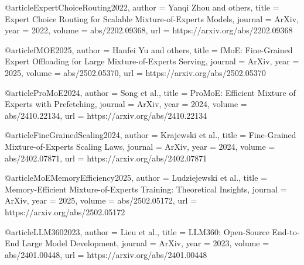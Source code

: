 @article{ExpertChoiceRouting2022,
  author    = {Yanqi Zhou and others},
  title     = {Expert Choice Routing for Scalable Mixture-of-Experts Models},
  journal   = {ArXiv},
  year      = {2022},
  volume    = {abs/2202.09368},
  url       = {https://arxiv.org/abs/2202.09368}
}

@article{fMOE2025,
  author    = {Hanfei Yu and others},
  title     = {fMoE: Fine-Grained Expert Offloading for Large Mixture-of-Experts Serving},
  journal   = {ArXiv},
  year      = {2025},
  volume    = {abs/2502.05370},
  url       = {https://arxiv.org/abs/2502.05370}
}

@article{ProMoE2024,
  author    = {Song et al.},
  title     = {ProMoE: Efficient Mixture of Experts with Prefetching},
  journal   = {ArXiv},
  year      = {2024},
  volume    = {abs/2410.22134},
  url       = {https://arxiv.org/abs/2410.22134}
}

@article{FineGrainedScaling2024,
  author    = {Krajewski et al.},
  title     = {Fine-Grained Mixture-of-Experts Scaling Laws},
  journal   = {ArXiv},
  year      = {2024},
  volume    = {abs/2402.07871},
  url       = {https://arxiv.org/abs/2402.07871}
}

@article{MoEMemoryEfficiency2025,
  author    = {Ludziejewski et al.},
  title     = {Memory-Efficient Mixture-of-Experts Training: Theoretical Insights},
  journal   = {ArXiv},
  year      = {2025},
  volume    = {abs/2502.05172},
  url       = {https://arxiv.org/abs/2502.05172}
}

@article{LLM3602023,
  author    = {Lieu et al.},
  title     = {LLM360: Open-Source End-to-End Large Model Development},
  journal   = {ArXiv},
  year      = {2023},
  volume    = {abs/2401.00448},
  url       = {https://arxiv.org/abs/2401.00448}
}
